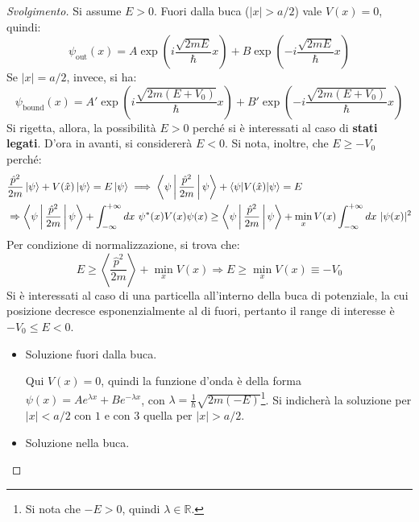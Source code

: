 \documentclass[11pt, a4paper]{scrartcl} %
\numberwithin{equation}{subsection}
\theoremstyle{style2}
\theoremstyle{style1}
\renewcommand\qedsymbol{$\blacksquare$}
\newenvironment{svolgimento}{\renewcommand\qedsymbol{$\spadesuit$}\begin{proof}[Svolgimento]}{\end{proof}}
\begin{document}
\begin{svolgimento}
	Si assume $E>0$. Fuori dalla buca ($\lvert x \rvert > a / 2$) vale $V(x) = 0$, quindi:
	\begin{equation}
		\psi _\text{out}(x) = A \exp \left(i \frac{\sqrt{2mE} }{\hbar }x\right) + B \exp \left( - i \frac{\sqrt{2mE} }{\hbar } x\right) 
	\end{equation}
	Se $\lvert x \rvert = a / 2$, invece, si ha:
	\begin{equation}
		\psi _\text{bound}(x) = A' \exp \left(i \frac{\sqrt{2m(E+V_0)} }{\hbar }x\right) + B' \exp \left( - i \frac{\sqrt{2m(E+V_0)} }{\hbar } x\right) 
	\end{equation}
	Si rigetta, allora, la possibilit\`a $E>0$ perch\'e si \`e interessati al caso di \textbf{stati legati}. D'ora in avanti, si considerer\`a $E<0$. Si nota, inoltre, che $E\ge -V_0$ perch\'e:
	\[
	\begin{split}
		&\frac{\hat{p}^2}{2m} \ket{\psi }  + V(\hat{x}) \ket{\psi } = E \ket{\psi } \implies \Braket{\psi |\frac{\hat{p}^2}{2m}|\psi } + \braket{\psi |V(\hat{x})|\psi } = E\\
		&\Rightarrow \Braket{\psi |\frac{\hat{p}^2}{2m}|\psi } + \int_{-\infty} ^{+\infty} dx\ \psi ^*(x) V(x) \psi (x) \ge \Braket{\psi |\frac{\hat{p}^2}{2m}|\psi } + \min_x V(x) \int_{-\infty} ^{+\infty} dx\ \lvert \psi (x) \rvert ^2
	\end{split}
	\] 
Per condizione di normalizzazione, si trova che: 
\begin{equation}
	E \ge \left\langle \frac{\hat{p}^2}{2m} \right\rangle + \min_x V(x) \Rightarrow  E\ge  \min_x V(x) \equiv -V_0
\end{equation}
Si \`e interessati al caso di una particella all'interno della buca di potenziale, la cui posizione decresce esponenzialmente al di fuori, pertanto il range di interesse \`e $-V_0\le E <0$. 

\begin{itemize}
	\item Soluzione fuori dalla buca.

		Qui $V(x) =0$, quindi la funzione d'onda \`e della forma $\psi (x) = Ae^{\lambda x} + B e^{-\lambda x} $, con $\lambda  = \frac{1}{\hbar } \sqrt{2m(-E)} $\footnote{Si nota che $-E > 0$, quindi $\lambda \in \mathbb{R}$.}. Si indicher\`a la soluzione per $\lvert x \rvert < a /2 $ con $1$ e con $3$ quella per $\lvert x \rvert > a / 2$.
	\item Soluzione nella buca.


\end{itemize}
\end{svolgimento}
\end{document}
